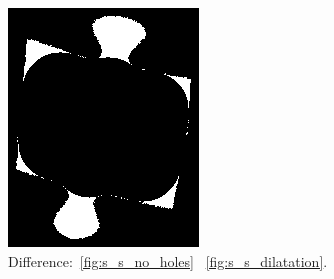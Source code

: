 \documentclass{article}
\begin{document}
\begin{figure}
\begin{subfigure}{0.3\textwidth}
    \includegraphics[width=\linewidth]{pictures/remove_knobs_knob_pixels.png}
    \caption{Difference:~\cref{fig:s_s_no_holes} \textminus~\cref{fig:s_s_dilatation}.}
    \label{fig:s_s_no_holes_minus_expansion}
  \end{subfigure}
  \hfill
  \begin{subfigure}{0.3\textwidth}
    \centering

\end{subfigure}
\end{figure}
\end{document}
